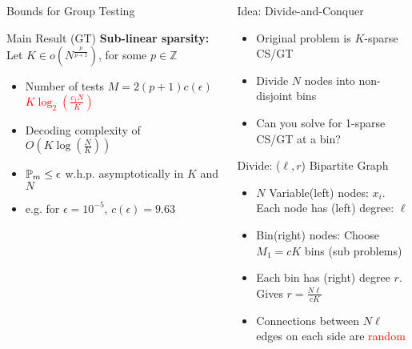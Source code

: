 \documentclass[final]{beamer}
\newlength{\onecolwid}
\newlength{\twocolwid}
\newlength{\blockskip}
\newlength{\negativeskip}
\begin{document}
\begin{frame}
\begin{columns}[t]
\begin{column}{\onecolwid}
\begin{block}{\Large Bounds for Group Testing}
	 
   \begin{alertblock}{\Large Main Result (GT)} 
	    \textbf{Sub-linear sparsity: }Let $K\in o(N^{\frac{p}{p+1}})$, for some $p\in\mathbb{Z}$
			\begin{itemize}
			\itemsep10pt
				\item Number of tests  $M=2(p+1)c(\epsilon)$ \textcolor{red}{$K\log_2 (\frac{c_1N}{K})$}
				\item Decoding complexity of $O\left(K\log(\frac{N}{K})\right)$ 
				\item $\mathbb{P}_{m}\leq \epsilon$ w.h.p. asymptotically in $K$ and $N$
				\item e.g. for $\epsilon=10^{-5}$, $c(\epsilon)=9.63$
			\end{itemize}
    	\end{alertblock}
	 \end{block}
  \end{column}

  \begin{column}{\twocolwid}
    \vspace{\negativeskip}

    \begin{block}{\Large Idea: Divide-and-Conquer}
    \begin{itemize}
		\item Original problem is $K$-sparse CS/GT  
    	\item Divide $N$ nodes into non-disjoint bins
	    \item Can you solve for 1-sparse CS/GT at a bin?
    \end{itemize}

    \begin{figure}
       \center
		\scalebox{1.3}{}
	\end{figure}

    \end{block}
    \vspace{\blockskip}

    \begin{block}{\Large Divide: ($\ell,r$) Bipartite Graph}
    \begin{itemize}
	    \item $N$ Variable(left) nodes: $x_i$. Each node has (left) degree: $\ell$
	    \item Bin(right) nodes: Choose $M_1=cK$ bins (sub problems)
	    \item  Each bin has (right) degree $r$. Gives $r=\frac{N\ell}{cK}$
	    \item Connections between $N\ell$ edges on each side are \textcolor{red}{random}
    \end{itemize}
    \end{block}  
\vspace{\blockskip}


\end{column}
\end{columns}
\end{frame}
\end{document}

